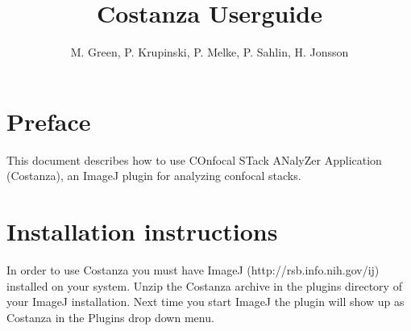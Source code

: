 \documentclass[a4paper,12pt]{article}
\title{Costanza Userguide}
\author{M. Green, P. Krupinski, P. Melke, P. Sahlin, H. Jonsson}
\begin{document}
\maketitle


\section{Preface}

This document describes how to use COnfocal STack ANalyZer Application
(Costanza), an ImageJ\cite{Abramoff2004} plugin for analyzing confocal stacks.

\section{Installation instructions}

In order to use Costanza you must have ImageJ
(http://rsb.info.nih.gov/ij) installed on your system. Unzip the
Costanza archive in the plugins directory of your ImageJ installation. Next
time you start ImageJ the plugin will show up as Costanza in the Plugins drop
down menu.



\end{document}
